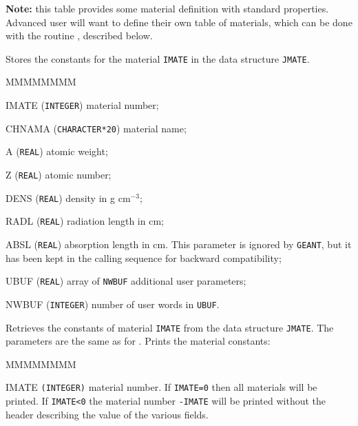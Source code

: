 {\bf Note:} this table provides some material definition with standard
properties. Advanced user will want to define their own table of materials,
which can be done with the routine , described below.
 
Stores the constants for the material {\tt IMATE} in the data structure
{\tt JMATE}.
\begin{DLtt}{MMMMMMMM}
\item[IMATE]      ({\tt INTEGER}) material number;
\item[CHNAMA]     ({\tt CHARACTER*20}) material name;
\item[A]           ({\tt REAL}) atomic weight;
\item[Z]           ({\tt REAL})  atomic number;
\item[DENS]        ({\tt REAL}) density in g cm$^{-3}$;
\item[RADL]        ({\tt REAL}) radiation length in cm;
\item[ABSL]        ({\tt REAL}) absorption length in cm. This parameter
is ignored by {\tt GEANT}, but it has been kept in the calling sequence for
backward compatibility;
\item[UBUF]       ({\tt REAL}) array of {\tt NWBUF} additional user parameters;
\item[NWBUF]      ({\tt INTEGER}) number of user words in {\tt UBUF}.
\end{DLtt}
Retrieves the constants of
material {\tt IMATE} from the data structure {\tt JMATE}. The parameters
are the same as for .
Prints the material constants:
\begin{DLtt}{MMMMMMMM}
\item[IMATE]   {\tt (INTEGER)} material number. If {\tt IMATE=0} then all
materials will be printed. If {\tt IMATE<0} the material number {\tt -IMATE}
will be printed without the header describing the value of the various fields.
\end{DLtt}
